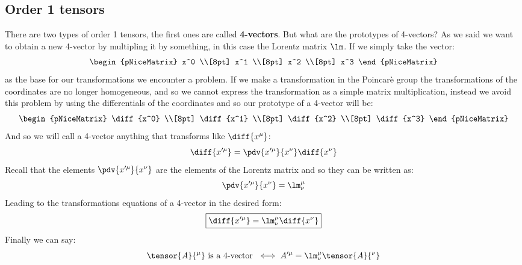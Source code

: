 \subsection{Order 1 tensors}
There are two types of order 1 tensors, the first ones are called \textbf{4-vectors}. But what are the prototypes of 4-vectors? As we said we want to obtain a new 4-vector by multipling it by something, in this case the Lorentz matrix $\lm$. If we simply take the vector:
\begin{equation}
  \begin{pNiceMatrix}
    x^0 \\[8pt]
    x^1 \\[8pt]
    x^2 \\[8pt]
    x^3
  \end{pNiceMatrix}
\end{equation}
as the base for our transformations we encounter a problem. If we make a transformation in the Poincarè group the transformations of the coordinates are no longer homogeneous, and so we cannot express the transformation as a simple matrix multiplication, instead we avoid this problem by using the differentials of the coordinates and so our prototype of a 4-vector will be:
\begin{equation}
  \begin{pNiceMatrix}
    \diff{x^0} \\[8pt]
    \diff{x^1} \\[8pt]
    \diff{x^2} \\[8pt]
    \diff{x^3}
  \end{pNiceMatrix}
\end{equation}
And so we will call a 4-vector anything that transforms like $\diff{x^{\mu}}$:
\begin{equation}
  \diff{x'^{\mu}} = \pdv{x'^{\mu}}{x^{\nu}} \diff{x^{\nu}}
\end{equation}
Recall that the elements $\pdv{x'^{\mu}}{x^{\nu}}$ are the elements of the Lorentz matrix and so they can be written as:
\begin{equation}
  \pdv{x'^{\mu}}{x^{\nu}} = \lm^{\mu}_{\nu}
\end{equation}
Leading to the transformations equations of a 4-vector in the desired form:
\begin{equation}
  \boxed{\diff{x'^{\mu}} = \lm^{\mu}_{\nu} \diff{x^{\nu}}}
\end{equation}
Finally we can say:
\begin{equation}
  \tensor{A}{^{\mu}} \text{ is a 4-vector } \iff A'^{\mu} = \lm^{\mu}_{\nu} \tensor{A}{^{\nu}}
\end{equation}
